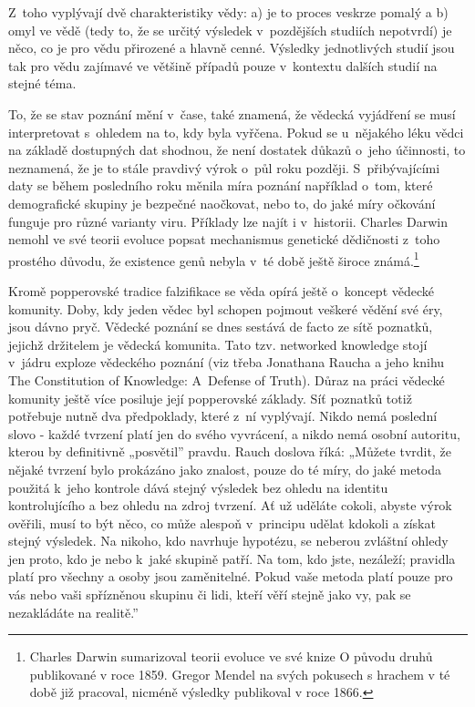 Z~toho vyplývají dvě charakteristiky vědy: a) je to proces veskrze pomalý a b) omyl ve vědě (tedy to, že se určitý výsledek v~pozdějších studiích nepotvrdí) je něco, co je pro vědu přirozené a hlavně cenné. Výsledky jednotlivých studií jsou tak pro vědu zajímavé ve většině případů pouze v~kontextu dalších studií na stejné téma.

To, že se stav poznání mění v~čase, také znamená, že vědecká vyjádření se musí interpretovat s~ohledem na to, kdy byla vyřčena. Pokud se u~nějakého léku vědci na základě dostupných dat shodnou, že není dostatek důkazů o~jeho účinnosti, to neznamená, že je to stále pravdivý výrok o~půl roku později. S~přibývajícími daty se během posledního roku měnila míra poznání například o~tom, které demografické skupiny je bezpečné naočkovat, nebo to, do jaké míry očkování funguje pro různé varianty viru. Příklady lze najít i v~historii. Charles Darwin nemohl ve své teorii evoluce popsat mechanismus genetické dědičnosti z~toho prostého důvodu, že existence genů nebyla v~té době ještě široce známá.\footnote{Charles Darwin sumarizoval teorii evoluce ve své knize O původu druhů publikované v roce 1859. Gregor Mendel na svých pokusech s hrachem v té době již pracoval, nicméně výsledky publikoval v roce 1866.}

Kromě popperovské tradice falzifikace se věda opírá ještě o~koncept vědecké komunity. Doby, kdy jeden vědec byl schopen pojmout veškeré vědění své éry, jsou dávno pryč. Vědecké poznání se dnes sestává de facto ze sítě poznatků, jejichž držitelem je vědecká komunita. Tato tzv. networked knowledge stojí v~jádru exploze vědeckého poznání (viz třeba Jonathana Raucha a jeho knihu The Constitution of Knowledge: A~Defense of Truth). Důraz na práci vědecké komunity ještě více posiluje její popperovské základy. Síť poznatků totiž potřebuje nutně dva předpoklady, které z~ní vyplývají. Nikdo nemá poslední slovo - každé tvrzení platí jen do svého vyvrácení, a nikdo nemá osobní autoritu, kterou by definitivně „posvětil” pravdu. Rauch doslova říká: „Můžete tvrdit, že nějaké tvrzení bylo prokázáno jako znalost, pouze do té míry, do jaké metoda použitá k~jeho kontrole dává stejný výsledek bez ohledu na identitu kontrolujícího a bez ohledu na zdroj tvrzení. Ať už uděláte cokoli, abyste výrok ověřili, musí to být něco, co může alespoň v~principu udělat kdokoli a získat stejný výsledek. Na nikoho, kdo navrhuje hypotézu, se neberou zvláštní ohledy jen proto, kdo je nebo k~jaké skupině patří. Na tom, kdo jste, nezáleží; pravidla platí pro všechny a osoby jsou zaměnitelné. Pokud vaše metoda platí pouze pro vás nebo vaši spřízněnou skupinu či lidi, kteří věří stejně jako vy, pak se nezakládáte na realitě.” \cite{Rauch2021}

